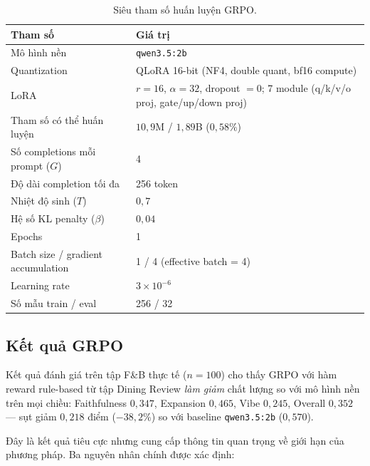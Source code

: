 \begin{table}[htbp]
  \centering
  \small
  \caption{Siêu tham số huấn luyện GRPO.}
  \label{tab:grpo-config}
  \begin{tabular}{p{}p{}}
    \toprule
    \textbf{Tham số} & \textbf{Giá trị} \\
    \midrule
    Mô hình nền & \texttt{qwen3.5:2b} \\
    Quantization & QLoRA 16-bit (NF4, double quant,
                   bf16 compute) \\
    LoRA & $r=16$, $\alpha=32$, dropout $=0$;
           7 module (q/k/v/o proj,
           gate/up/down proj) \\
    Tham số có thể huấn luyện &
      $10{,}9$M / $1{,}89$B ($0{,}58\%$) \\
    \midrule
    Số completions mỗi prompt ($G$) & 4 \\
    Độ dài completion tối đa & 256 token \\
    Nhiệt độ sinh ($T$) & $0{,}7$ \\
    Hệ số KL penalty ($\beta$) & $0{,}04$ \\
    \midrule
    Epochs & 1 \\
    Batch size / gradient accumulation &
      1 / 4 (effective batch = 4) \\
    Learning rate & $3 \times 10^{-6}$ \\
    Số mẫu train / eval & 256 / 32 \\
    \bottomrule
  \end{tabular}
\end{table}

\subsection{Kết quả GRPO}

Kết quả đánh giá trên tập F\&B thực tế ($n = 100$) cho thấy GRPO với
hàm reward rule-based từ tập Dining Review \emph{làm giảm} chất lượng
so với mô hình nền trên mọi chiều: Faithfulness $0{,}347$, Expansion
$0{,}465$, Vibe $0{,}245$, Overall $0{,}352$ --- sụt giảm $0{,}218$
điểm ($-38{,}2\%$) so với baseline \texttt{qwen3.5:2b} ($0{,}570$).

Đây là kết quả tiêu cực nhưng cung cấp thông tin quan trọng về giới
hạn của phương pháp. Ba nguyên nhân chính được xác định:

